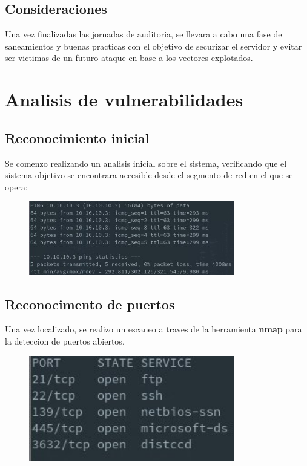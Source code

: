 \documentclass[a4paper]{article}%
\begin{document}
	\subsection{Consideraciones}
	Una vez finalizadas las jornadas de auditoria, se llevara a cabo una fase de 
	saneamientos y buenas practicas con el objetivo de securizar el servidor y evitar
	ser victimas de un futuro ataque en base a los vectores explotados. 		

	\vspace{0.5cm}

	\clearpage
	\section{Analisis de vulnerabilidades}
	\subsection{Reconocimiento inicial}

	\vspace{0.2cm}
	Se comenzo realizando un analisis inicial sobre el sistema, verificando que el sistema
	objetivo se encontrara accesible desde el segmento de red en el que se opera:

	\begin{figure}[h]
	\includegraphics[width=0.8\textwidth]{images/ping.jpg}
	\end{figure}

	\vspace{0.2cm}


	\subsection{Reconocimento de puertos}
	
	Una vez localizado, se realizo un escaneo a traves de la herramienta \textbf{nmap}
	para la deteccion de puertos abiertos.

	\begin{figure}[h]
	\includegraphics[width=0.8\textwidth]{images/nmap_comun.jpg}
	\end{figure}
\end{document}
